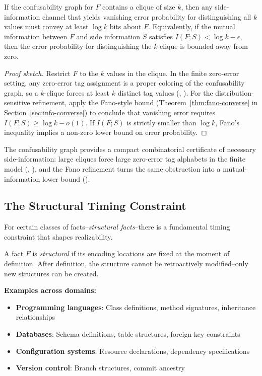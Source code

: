 \begin{lemma}\label{lem:confusability-clique}
If the confusability graph for $F$ contains a clique of size $k$, then any side-information channel that yields vanishing error probability for distinguishing all $k$ values must convey at least $\log k$ bits about $F$. Equivalently, if the mutual information between $F$ and side information $S$ satisfies $I(F;S)<\log k - \epsilon$, then the error probability for distinguishing the $k$-clique is bounded away from zero.
\end{lemma}

\begin{proof}[Proof sketch]
Restrict $F$ to the $k$ values in the clique. In the finite zero-error setting, any zero-error tag assignment is a proper coloring of the confusability graph, so a $k$-clique forces at least $k$ distinct tag values (, ). For the distribution-sensitive refinement, apply the Fano-style bound (Theorem~\ref{thm:fano-converse} in Section~\ref{sec:info-converse}) to conclude that vanishing error requires $I(F;S)\ge\log k - o(1)$. If $I(F;S)$ is strictly smaller than $\log k$, Fano's inequality implies a non-zero lower bound on error probability.
\end{proof}

\noindent The confusability graph provides a compact combinatorial certificate of necessary side-information: large cliques force large zero-error tag alphabets in the finite model (, ), and the Fano refinement turns the same obstruction into a mutual-information lower bound ().

\subsection{The Structural Timing Constraint}\label{sec:timing}

For certain classes of facts--\emph{structural facts}--there is a fundamental timing constraint that shapes realizability.

\begin{definition}\label{def:structural-fact-req}
A fact $F$ is \emph{structural} if its encoding locations are fixed at the moment of definition. After definition, the structure cannot be retroactively modified--only new structures can be created.
\end{definition}

\textbf{Examples across domains:}
\begin{itemize}
\tightlist
\item \textbf{Programming languages}: Class definitions, method signatures, inheritance relationships
\item \textbf{Databases}: Schema definitions, table structures, foreign key constraints
\item \textbf{Configuration systems}: Resource declarations, dependency specifications
\item \textbf{Version control}: Branch structures, commit ancestry
\end{itemize}

